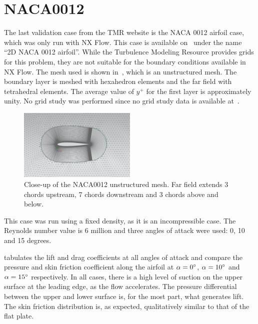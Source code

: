 \section{NACA0012}
The last validation case from the TMR website is the NACA 0012 airfoil case, which was only run with NX Flow. This case is available on~\cite{tmr} under the name ``2D NACA 0012 airfoil''. While the Turbulence Modeling Resource provides grids for this problem, they are not suitable for the boundary conditions available in NX Flow. The mesh used is shown in~, which is an unstructured mesh. The boundary layer is meshed with hexahedron elements and the far field with tetrahedral elements. The average value of $y^+$ for the first layer is approximately unity. No grid study was performed since no grid study data is available at~\cite{tmr}.
\begin{figure}
    \centering
    \includegraphics[width=0.5\textwidth]{figs/naca0012/naca0012.png}
    \caption{Close-up of the NACA0012 unstructured mesh. Far field extends 3 chords upstream, 7 chords downstream and 3 chords above and below.}
    \label{fig:naca0012}
\end{figure}
This case was run using a fixed density, as it is an incompressible case. The Reynolds number value is 6 million and three angles of attack were used: 0, 10 and 15 degrees.

 tabulates the lift and drag coefficients at all angles of attack and  compare the pressure and skin friction coefficient along the airfoil at $\alpha=0^\circ$, $\alpha=10^\circ$ and $\alpha=15^\circ$ respectively. In all cases, there is a high level of suction on the upper surface at the leading edge, as the flow accelerates. The pressure differential between the upper and lower surface is, for the most part, what generates lift. The skin friction distribution is, as expected, qualitatively similar to that of the flat plate.

